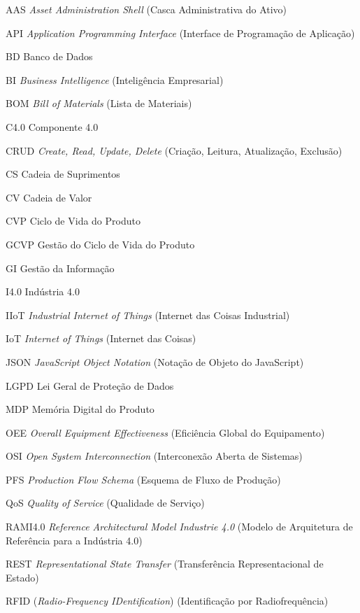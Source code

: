 \begin{siglas}
	\item[AAS] \textit{Asset Administration Shell} (Casca Administrativa do Ativo)
	\item[API] \textit{Application Programming Interface} (Interface de Programação de Aplicação)
	\item[BD] Banco de Dados
	\item[BI] \textit{Business Intelligence} (Inteligência Empresarial)
	\item[BOM] \textit{Bill of Materials} (Lista de Materiais)
	\item[C4.0] Componente 4.0
	\item[CRUD] \textit{Create, Read, Update, Delete} (Criação, Leitura, Atualização, Exclusão)
	\item[CS] Cadeia de Suprimentos
	\item[CV] Cadeia de Valor
	\item[CVP] Ciclo de Vida do Produto
	\item[GCVP] Gestão do Ciclo de Vida do Produto
	\item[GI] Gestão da Informação
	\item[I4.0] Indústria 4.0
	\item[IIoT] \textit{Industrial Internet of Things} (Internet das Coisas Industrial)
	\item[IoT] \textit{Internet of Things} (Internet das Coisas)
	\item[JSON] \textit{JavaScript Object Notation} (Notação de Objeto do JavaScript)
	\item[LGPD] Lei Geral de Proteção de Dados
	\item[MDP] Memória Digital do Produto
	\item[OEE] \textit{Overall Equipment Effectiveness} (Eficiência Global do Equipamento)
	\item[OSI] \textit{Open System Interconnection} (Interconexão Aberta de Sistemas)
	\item[PFS] \textit{Production Flow Schema} (Esquema de Fluxo de Produção)
	\item[QoS] \textit{Quality of Service} (Qualidade de Serviço)
	\item[RAMI4.0] \textit{Reference Architectural Model Industrie 4.0} (Modelo de Arquitetura de Referência para a Indústria 4.0)
	\item[REST] \textit{Representational State Transfer} (Transferência Representacional de Estado)
	\item[RFID] (\textit{Radio-Frequency IDentification}) (Identificação por Radiofrequência)

\end{siglas}
